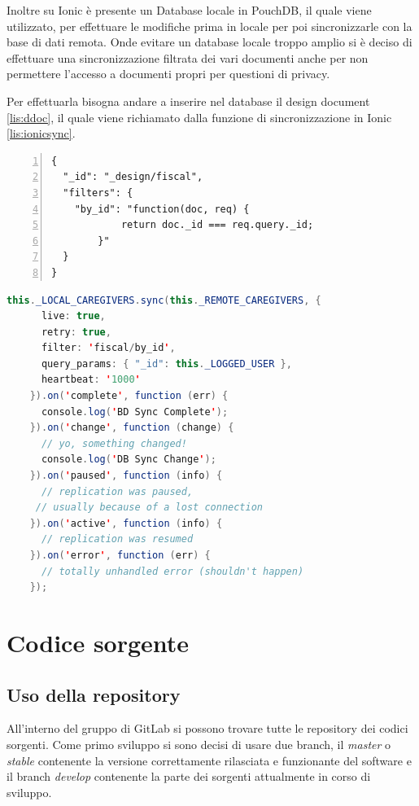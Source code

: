 \documentclass[a4paper,titlepage]{book}
\begin{document}
Inoltre su Ionic \`{e} presente un Database locale in PouchDB, il quale viene utilizzato, per effettuare le modifiche prima in locale per poi sincronizzarle con la base di dati remota. Onde evitare un database locale troppo amplio si \`{e} deciso di effettuare una sincronizzazione filtrata dei vari documenti anche per non permettere l'accesso a documenti propri per questioni di privacy. 

Per effettuarla bisogna andare a inserire nel database il design document \ref{lis:ddoc}, il quale viene richiamato dalla funzione di sincronizzazione in Ionic \ref{lis:ionicsync}.
\begin{lstlisting}[showspaces=false,
           basicstyle=\ttfamily,
           numbers=left,
           numberstyle=\tiny,
           commentstyle=\color{gray},
	  captionpos=b,
	  caption=Design document,
	  label=lis:ddoc]
{
  "_id": "_design/fiscal",
  "filters": {
    "by_id": "function(doc, req) { 
			return doc._id === req.query._id; 
		}"
  }
}

\end{lstlisting}

\pagebreak
\begin{lstlisting}[language=Java,
	  captionpos=b,
	  caption=Funzione di sincronizzazione,
	  label=lis:ionicsync]
this._LOCAL_CAREGIVERS.sync(this._REMOTE_CAREGIVERS, {
      live: true,
      retry: true,
      filter: 'fiscal/by_id',
      query_params: { "_id": this._LOGGED_USER },
      heartbeat: '1000'
    }).on('complete', function (err) {
      console.log('BD Sync Complete');
    }).on('change', function (change) {
      // yo, something changed!
      console.log('DB Sync Change');
    }).on('paused', function (info) {
      // replication was paused, 
     // usually because of a lost connection
    }).on('active', function (info) {
      // replication was resumed
    }).on('error', function (err) {
      // totally unhandled error (shouldn't happen)
    });
\end{lstlisting}

\chapter{Codice sorgente}
\section{Uso della repository}
All'interno del gruppo di GitLab si possono trovare tutte le repository dei codici sorgenti. Come primo sviluppo si sono decisi di usare due branch, il \textit{master} o \textit{stable} contenente la versione correttamente rilasciata e funzionante del software e il branch \textit{develop} contenente la parte dei sorgenti attualmente in corso di sviluppo.
\end{document}
